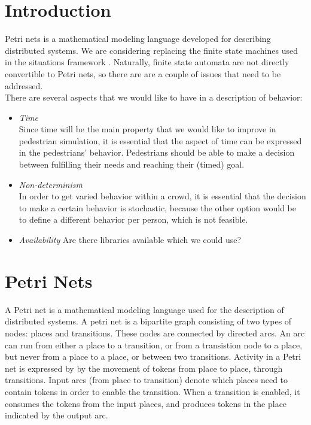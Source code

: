 \documentclass[11pt]{article}
\begin{document}
\maketitle

\section{Introduction}
Petri nets is a mathematical modeling language developed for describing distributed systems. We are considering replacing the finite state machines used in the situations framework \cite{Sung04scalablebehaviors}. Naturally, finite state automata are not directly convertible to Petri nets, so there are are a couple of issues that need to be addressed.\\
There are several aspects that we would like to have in a description of behavior:
\begin{itemize}
\item \emph{Time}\\
Since time will be the main property that we would like to improve in pedestrian simulation, it is essential that the aspect of time can be expressed in the pedestrians' behavior. Pedestrians should be able to make a decision between fulfilling their needs and reaching their (timed) goal.

\item \emph{Non-determinism}\\
In order to get varied behavior within a crowd, it is essential that the decision to make a certain behavior is stochastic, because the other option would be to define a different behavior per person, which is not feasible.

\item \emph{Availability}
Are there libraries available which we could use?

\end{itemize}

\section{Petri Nets}
A Petri net is a mathematical modeling language used for the description of distributed systems. A petri net is a bipartite graph consisting of two types of nodes: places and transitions. These nodes are connected by directed arcs. An arc can run from either a place to a transition, or from a transistion node to a place, but never from a place to a place, or between two transitions. Activity in a Petri net is expressed by by the movement of tokens from place to place, through transitions. Input arcs (from place to transition) denote which places need to contain tokens in order to enable the transition. When a transition is enabled, it consumes the tokens from the input places, and produces tokens in the place indicated by the output arc. 
\end{document}
